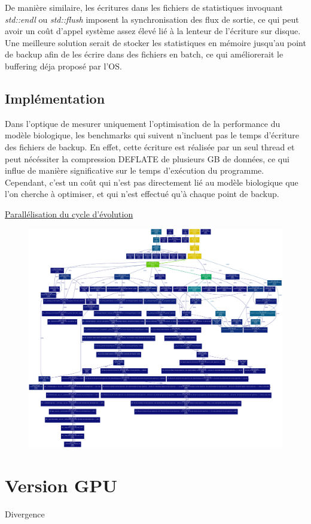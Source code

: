 \documentclass[a4paper, 10pt, twoside]{article}
\begin{document}
De manière similaire, les écritures dans les fichiers de statistiques invoquant \textit{std::endl} ou \textit{std::flush} imposent la synchronisation des flux de sortie, ce qui peut avoir un coût d'appel système assez élevé lié à la lenteur de l'écriture sur disque. Une meilleure solution serait de stocker les statistiques en mémoire jusqu'au point de backup afin de les écrire dans des fichiers en batch, ce qui améliorerait le buffering déja proposé par l'OS.

\subsection{Implémentation}

Dans l'optique de mesurer uniquement l'optimisation de la performance du modèle biologique, les benchmarks qui suivent n'incluent pas le temps d'écriture des fichiers de backup. En effet, cette écriture est réalisée par un seul thread et peut nécéssiter la compression DEFLATE de plusieurs GB de données, ce qui influe de manière significative sur le temps d'exécution du programme. Cependant, c'est un coût qui n'est pas directement lié au modèle biologique que l'on cherche à optimiser, et qui n'est effectué qu'à chaque point de backup.

\hyperref[parallel/orga]{Parallélisation du cycle d'évolution}

\begin{figure}
	\includegraphics[width=\linewidth]{img/init_profile_debug.eps}
\end{figure}
\section{Version GPU}

Divergence \citep{nvidia/branching}





\end{document}
